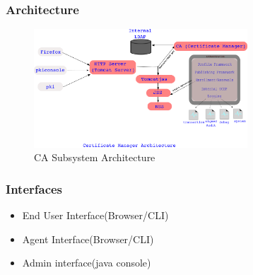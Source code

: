 \documentclass[a4paper]{article}
\begin{document}
\subsubsection{Architecture}
     \begin{figure}[H]
          \centering
          \includegraphics[width=80mm]{CA-subsystem-Arch3.png}
          \caption{CA Subsystem Architecture}
    \end{figure}
\subsubsection{Interfaces}
    \begin{itemize}
        \item End User Interface(Browser/CLI)
        \item Agent Interface(Browser/CLI)
        \item Admin interface(java console)
    \end{itemize}
\end{document}
